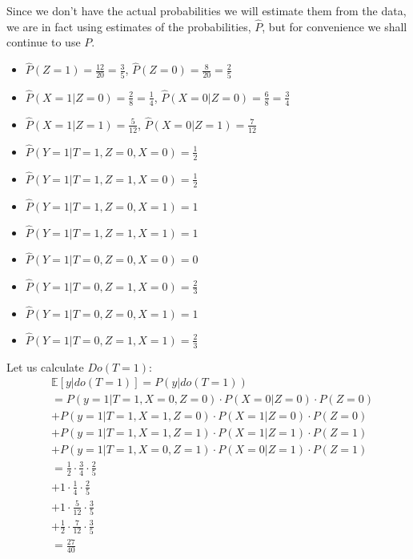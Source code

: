 \documentclass{article}
\begin{document}
Since we don't have the actual probabilities we will estimate them from the data, we are in fact using estimates of the probabilities, $\hat{P}$, but for convenience we shall continue to use $P$.
\begin{itemize}
	\item $\hat{P}(Z=1)=\frac{12}{20}=\frac{3}{5}$, $\hat{P}(Z=0)=\frac{8}{20}=\frac{2}{5}$
	\item $\hat{P}(X=1|Z=0)=\frac{2}{8}=\frac{1}{4}$, $\hat{P}(X=0|Z=0)=\frac{6}{8}=\frac{3}{4}$
	\item $\hat{P}(X=1|Z=1)=\frac{5}{12}$, $\hat{P}(X=0|Z=1)=\frac{7}{12}$
	\item $\hat{P}(Y=1|T=1,Z=0,X=0)=\frac{1}{2}$
	\item $\hat{P}(Y=1|T=1,Z=1,X=0)=\frac{1}{2}$
	\item $\hat{P}(Y=1|T=1,Z=0,X=1)=1$
	\item $\hat{P}(Y=1|T=1,Z=1,X=1)=1$
	\item $\hat{P}(Y=1|T=0,Z=0,X=0)=0$
	\item $\hat{P}(Y=1|T=0,Z=1,X=0)=\frac{2}{3}$
	\item $\hat{P}(Y=1|T=0,Z=0,X=1)=1$
	\item $\hat{P}(Y=1|T=0,Z=1,X=1)=\frac{2}{3}$
\end{itemize}

Let us calculate $Do(T=1)$:
\begin{equation*}
    \begin{split}
	& \mathds{E}[y|do(T=1)] = P(y|do(T=1)) \\
        & = P(y=1|T=1, X=0, Z=0)\cdot{}P(X=0|Z=0)\cdot{}P(Z=0) \\
        & +P(y=1|T=1, X=1, Z=0)\cdot{}P(X=1|Z=0)\cdot{}P(Z=0) \\
        & +P(y=1|T=1, X=1, Z=1)\cdot{}P(X=1|Z=1)\cdot{}P(Z=1) \\
        & +P(y=1|T=1, X=0, Z=1)\cdot{}P(X=0|Z=1)\cdot{}P(Z=1) \\
        & = \frac{1}{2} \cdot \frac{3}{4} \cdot \frac{2}{5} \\
        & + 1 \cdot \frac{1}{4} \cdot \frac{2}{5} \\
        & + 1 \cdot \frac{5}{12} \cdot \frac{3}{5} \\
        & + \frac{1}{2} \cdot \frac{7}{12} \cdot \frac{3}{5} \\
        & = \frac{27}{40}
    \end{split}
\end{equation*}
\end{document}
